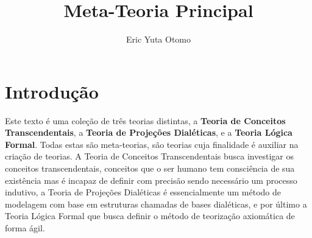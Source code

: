 \documentclass[10pt,a4paper]{report}
\author{Eric Yuta Otomo}
\begin{document}
\title{Meta-Teoria Principal}
\maketitle

\tableofcontents

\hspace{\baselineskip}

%

\newpage


\section*{Introdução}

\hspace{\baselineskip}

Este texto é uma coleção de três teorias distintas, a \textbf{Teoria de Conceitos Transcendentais}, a \textbf{Teoria de Projeções Dialéticas},  e a \textbf{Teoria Lógica Formal}. Todas estas são meta-teorias, são teorias cuja finalidade é auxiliar na criação de teorias. A Teoria de Conceitos Transcendentais busca investigar os conceitos transcendentais, conceitos que o ser humano tem consciência de sua existência mas é incapaz de definir com precisão sendo necessário um processo indutivo, a Teoria de Projeções Dialéticas é essencialmente um método de modelagem com base em estruturas chamadas de bases dialéticas, e por último a Teoria Lógica Formal que busca definir o método de teorização axiomática de forma ágil.


\hspace{\baselineskip}
\end{document}
